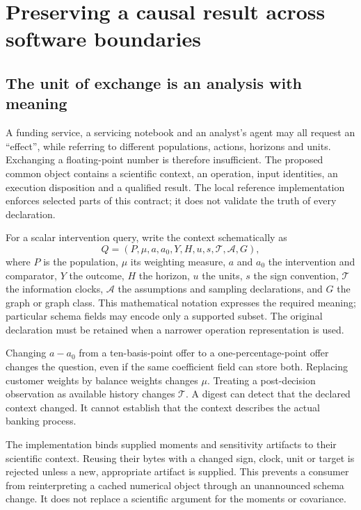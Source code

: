 \chapter{Preserving a causal result across software boundaries}
\label{in:semantics}

\section{The unit of exchange is an analysis with meaning}

A funding service, a servicing notebook and an analyst's agent may all request
an ``effect'', while referring to different populations, actions, horizons and
units. Exchanging a floating-point number is therefore insufficient. The
proposed common object contains a scientific context, an operation, input
identities, an execution disposition and a qualified result. The local
reference implementation enforces selected parts of this contract; it does not
validate the truth of every declaration.\cite{v12_in_contract,v12_in_runtime}

For a scalar intervention query, write the context schematically as
\[
 Q=(P,\mu,a,a_0,Y,H,u,s,\mathcal T,\mathcal A,G),
\]
where $P$ is the population, $\mu$ its weighting measure, $a$ and $a_0$ the
intervention and comparator, $Y$ the outcome, $H$ the horizon, $u$ the units,
$s$ the sign convention, $\mathcal T$ the information clocks, $\mathcal A$ the
assumptions and sampling declarations, and $G$ the graph or graph class.
This mathematical notation expresses the required meaning; particular schema
fields may encode only a supported subset. The original declaration must be
retained when a narrower operation representation is used.

Changing $a-a_0$ from a ten-basis-point offer to a one-percentage-point offer
changes the question, even if the same coefficient field can store both.
Replacing customer weights by balance weights changes $\mu$. Treating a
post-decision observation as available history changes $\mathcal T$. A digest
can detect that the declared context changed. It cannot establish that the
context describes the actual banking process.

The implementation binds supplied moments and sensitivity artifacts to their
scientific context. Reusing their bytes with a changed sign, clock, unit or
target is rejected unless a new, appropriate artifact is supplied. This
prevents a consumer from reinterpreting a cached numerical object through an
unannounced schema change. It does not replace a scientific argument for the
moments or covariance.\cite{v12_in_runtime}

